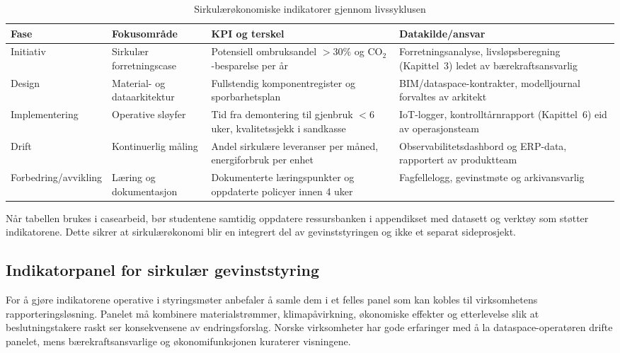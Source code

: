 \begin{table}[h]
    \centering
    \caption{Sirkulærøkonomiske indikatorer gjennom livssyklusen}
    \label{tab:sirkular-livssyklus}
    \begin{tabular}{p{2.7cm}p{3.7cm}p{3.5cm}p{3.0cm}}
        \toprule
        Fase & Fokusområde & KPI og terskel & Datakilde/ansvar \\
        \midrule
        Initiativ & Sirkulær forretningscase & Potensiell ombruksandel $>30\%$ og CO$_2$-besparelse per år & Forretningsanalyse, livsløpsberegning (Kapittel~3) ledet av bærekraftsansvarlig \\
        Design & Material- og dataarkitektur & Fullstendig komponentregister og sporbarhetsplan & BIM/dataspace-kontrakter, modelljournal forvaltes av arkitekt \\
        Implementering & Operative sløyfer & Tid fra demontering til gjenbruk $<6$ uker, kvalitetssjekk i sandkasse & IoT-logger, kontrolltårnrapport (Kapittel~6) eid av operasjonsteam \\
        Drift & Kontinuerlig måling & Andel sirkulære leveranser per måned, energiforbruk per enhet & Observabilitetsdashbord og ERP-data, rapportert av produktteam \\
        Forbedring/avvikling & Læring og dokumentasjon & Dokumenterte læringspunkter og oppdaterte policyer innen 4 uker & Fagfellelogg, gevinstmøte og arkivansvarlig \\
        \bottomrule
    \end{tabular}
\end{table}

Når tabellen brukes i casearbeid, bør studentene samtidig oppdatere ressursbanken i appendikset med datasett og verktøy som støtter indikatorene. Dette sikrer at sirkulærøkonomi blir en integrert del av gevinststyringen og ikke et separat sideprosjekt.

\subsection*{Indikatorpanel for sirkulær gevinststyring}
For å gjøre indikatorene operative i styringsmøter anbefaler \citet{miljodir2024indikatorveileder} å samle dem i et felles panel som kan kobles til virksomhetens rapporteringsløsning. Panelet må kombinere materialstrømmer, klimapåvirkning, økonomiske effekter og etterlevelse slik at beslutningstakere raskt ser konsekvensene av endringsforslag. Norske virksomheter har gode erfaringer med å la dataspace-operatøren drifte panelet, mens bærekraftsansvarlige og økonomifunksjonen kuraterer visningene.\citep{dfo2023baerekraft,hydro2023traceability}

